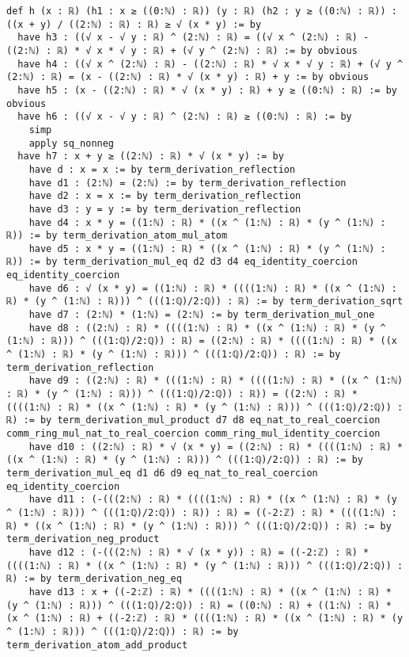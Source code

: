 \documentclass{article}
\begin{document}
\begin{tcolorbox}[colback=white!10, width=\linewidth]
\begin{lstlisting}[language=Lean4]
def h (x : ℝ) (h1 : x ≥ ((0:ℕ) : ℝ)) (y : ℝ) (h2 : y ≥ ((0:ℕ) : ℝ)) : ((x + y) / ((2:ℕ) : ℝ) : ℝ) ≥ √ (x * y) := by
  have h3 : ((√ x - √ y : ℝ) ^ (2:ℕ) : ℝ) = ((√ x ^ (2:ℕ) : ℝ) - ((2:ℕ) : ℝ) * √ x * √ y : ℝ) + (√ y ^ (2:ℕ) : ℝ) := by obvious
  have h4 : ((√ x ^ (2:ℕ) : ℝ) - ((2:ℕ) : ℝ) * √ x * √ y : ℝ) + (√ y ^ (2:ℕ) : ℝ) = (x - ((2:ℕ) : ℝ) * √ (x * y) : ℝ) + y := by obvious
  have h5 : (x - ((2:ℕ) : ℝ) * √ (x * y) : ℝ) + y ≥ ((0:ℕ) : ℝ) := by obvious
  have h6 : ((√ x - √ y : ℝ) ^ (2:ℕ) : ℝ) ≥ ((0:ℕ) : ℝ) := by
    simp
    apply sq_nonneg
  have h7 : x + y ≥ ((2:ℕ) : ℝ) * √ (x * y) := by
    have d : x = x := by term_derivation_reflection
    have d1 : (2:ℕ) = (2:ℕ) := by term_derivation_reflection
    have d2 : x = x := by term_derivation_reflection
    have d3 : y = y := by term_derivation_reflection
    have d4 : x * y = ((1:ℕ) : ℝ) * ((x ^ (1:ℕ) : ℝ) * (y ^ (1:ℕ) : ℝ)) := by term_derivation_atom_mul_atom
    have d5 : x * y = ((1:ℕ) : ℝ) * ((x ^ (1:ℕ) : ℝ) * (y ^ (1:ℕ) : ℝ)) := by term_derivation_mul_eq d2 d3 d4 eq_identity_coercion eq_identity_coercion
    have d6 : √ (x * y) = ((1:ℕ) : ℝ) * ((((1:ℕ) : ℝ) * ((x ^ (1:ℕ) : ℝ) * (y ^ (1:ℕ) : ℝ))) ^ (((1:ℚ)/2:ℚ)) : ℝ) := by term_derivation_sqrt
    have d7 : (2:ℕ) * (1:ℕ) = (2:ℕ) := by term_derivation_mul_one
    have d8 : ((2:ℕ) : ℝ) * ((((1:ℕ) : ℝ) * ((x ^ (1:ℕ) : ℝ) * (y ^ (1:ℕ) : ℝ))) ^ (((1:ℚ)/2:ℚ)) : ℝ) = ((2:ℕ) : ℝ) * ((((1:ℕ) : ℝ) * ((x ^ (1:ℕ) : ℝ) * (y ^ (1:ℕ) : ℝ))) ^ (((1:ℚ)/2:ℚ)) : ℝ) := by term_derivation_reflection
    have d9 : ((2:ℕ) : ℝ) * (((1:ℕ) : ℝ) * ((((1:ℕ) : ℝ) * ((x ^ (1:ℕ) : ℝ) * (y ^ (1:ℕ) : ℝ))) ^ (((1:ℚ)/2:ℚ)) : ℝ)) = ((2:ℕ) : ℝ) * ((((1:ℕ) : ℝ) * ((x ^ (1:ℕ) : ℝ) * (y ^ (1:ℕ) : ℝ))) ^ (((1:ℚ)/2:ℚ)) : ℝ) := by term_derivation_mul_product d7 d8 eq_nat_to_real_coercion comm_ring_mul_nat_to_real_coercion comm_ring_mul_identity_coercion
    have d10 : ((2:ℕ) : ℝ) * √ (x * y) = ((2:ℕ) : ℝ) * ((((1:ℕ) : ℝ) * ((x ^ (1:ℕ) : ℝ) * (y ^ (1:ℕ) : ℝ))) ^ (((1:ℚ)/2:ℚ)) : ℝ) := by term_derivation_mul_eq d1 d6 d9 eq_nat_to_real_coercion eq_identity_coercion
    have d11 : (-(((2:ℕ) : ℝ) * ((((1:ℕ) : ℝ) * ((x ^ (1:ℕ) : ℝ) * (y ^ (1:ℕ) : ℝ))) ^ (((1:ℚ)/2:ℚ)) : ℝ)) : ℝ) = ((-2:ℤ) : ℝ) * ((((1:ℕ) : ℝ) * ((x ^ (1:ℕ) : ℝ) * (y ^ (1:ℕ) : ℝ))) ^ (((1:ℚ)/2:ℚ)) : ℝ) := by term_derivation_neg_product
    have d12 : (-(((2:ℕ) : ℝ) * √ (x * y)) : ℝ) = ((-2:ℤ) : ℝ) * ((((1:ℕ) : ℝ) * ((x ^ (1:ℕ) : ℝ) * (y ^ (1:ℕ) : ℝ))) ^ (((1:ℚ)/2:ℚ)) : ℝ) := by term_derivation_neg_eq
    have d13 : x + ((-2:ℤ) : ℝ) * ((((1:ℕ) : ℝ) * ((x ^ (1:ℕ) : ℝ) * (y ^ (1:ℕ) : ℝ))) ^ (((1:ℚ)/2:ℚ)) : ℝ) = ((0:ℕ) : ℝ) + ((1:ℕ) : ℝ) * (x ^ (1:ℕ) : ℝ) + ((-2:ℤ) : ℝ) * ((((1:ℕ) : ℝ) * ((x ^ (1:ℕ) : ℝ) * (y ^ (1:ℕ) : ℝ))) ^ (((1:ℚ)/2:ℚ)) : ℝ) := by term_derivation_atom_add_product

\end{lstlisting}
\end{tcolorbox}
\end{document}
